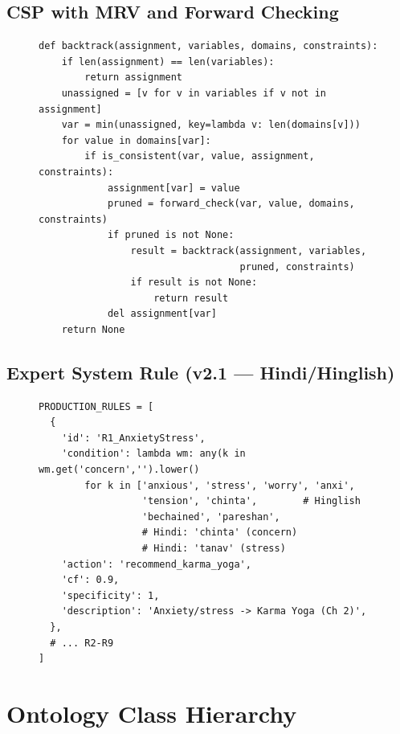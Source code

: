\documentclass[conference]{IEEEtran}
\begin{document}
\subsection{CSP with MRV and Forward Checking}

\begin{figure}[!t]
\begin{lstlisting}[language=Python3, caption={CSP backtracking with MRV + forward checking}]
def backtrack(assignment, variables, domains, constraints):
    if len(assignment) == len(variables):
        return assignment
    unassigned = [v for v in variables if v not in assignment]
    var = min(unassigned, key=lambda v: len(domains[v]))
    for value in domains[var]:
        if is_consistent(var, value, assignment, constraints):
            assignment[var] = value
            pruned = forward_check(var, value, domains, constraints)
            if pruned is not None:
                result = backtrack(assignment, variables,
                                   pruned, constraints)
                if result is not None:
                    return result
            del assignment[var]
    return None
\end{lstlisting}
\end{figure}

\subsection{Expert System Rule (v2.1 — Hindi/Hinglish)}

\begin{figure}[!t]
\begin{lstlisting}[language=Python3, caption={Production rule with multilingual keyword support}]
PRODUCTION_RULES = [
  {
    'id': 'R1_AnxietyStress',
    'condition': lambda wm: any(k in wm.get('concern','').lower()
        for k in ['anxious', 'stress', 'worry', 'anxi',
                  'tension', 'chinta',        # Hinglish
                  'bechained', 'pareshan',
                  # Hindi: 'chinta' (concern)
                  # Hindi: 'tanav' (stress)
    'action': 'recommend_karma_yoga',
    'cf': 0.9,
    'specificity': 1,
    'description': 'Anxiety/stress -> Karma Yoga (Ch 2)',
  },
  # ... R2-R9
]
\end{lstlisting}
\end{figure}

\section{Ontology Class Hierarchy}
\end{document}
